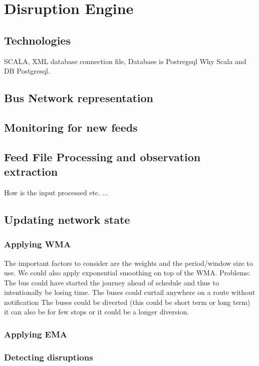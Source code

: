 \section{Disruption Engine}
	\subsection{Technologies}
	SCALA, XML database connection file, Database is Postregsql
	Why Scala and DB Postgresql.
	\subsection{Bus Network representation}
	
	\subsection{Monitoring for new feeds}
	
	\subsection{Feed File Processing and observation extraction}
	How is the input processed etc. ...
	
	\subsection{Updating network state}
	
		\subsubsection{Applying WMA}
	The important factors to consider are the weights and the period/window size to use. We could also apply exponential smoothing on top of the WMA.
	Problems:
The bus could have started the journey ahead of schedule and thus to intentionally be losing time.
The buses could curtail anywhere on a route without notification
The buses could be diverted (this could be short term or long term) it can also be for few stops or it could be a longer diversion.

		\subsubsection{Applying EMA}
		
		\subsubsection{Detecting disruptions}
	
